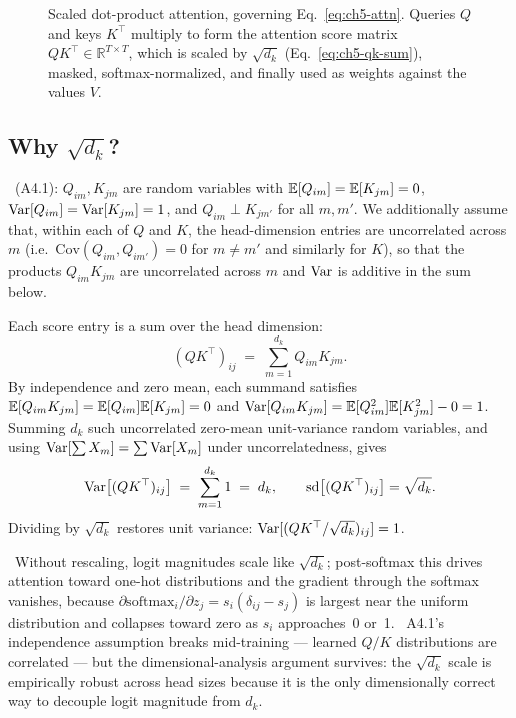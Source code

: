 \begin{figure}[h]
\centering

\caption{Scaled dot-product attention, governing
  Eq.~\eqref{eq:ch5-attn}. Queries $Q$ and keys $K^{\top}$ multiply
  to form the attention score matrix $Q K^{\top} \in \mathbb{R}^{T
  \times T}$, which is scaled by $\sqrt{d_k}$
  (Eq.~\eqref{eq:ch5-qk-sum}), masked, softmax-normalized, and
  finally used as weights against the values $V$.}
\label{fig:week4-attn-scores}
\end{figure}

\subsection{\texorpdfstring{Why $\sqrt{d_k}$?}{Why sqrt(d\_k)?}}

\begin{derivation}
\Assum\ (A4.1): $Q_{im}, K_{jm}$ are random variables with
$\mathbb{E}[Q_{im}] = \mathbb{E}[K_{jm}] = 0$, $\mathrm{Var}[Q_{im}] = \mathrm{Var}[K_{jm}] = 1$,
and $Q_{im} \perp K_{jm'}$ for all $m,m'$. We additionally assume
that, within each of $Q$ and $K$, the head-dimension entries are
uncorrelated across $m$ (i.e.\ $\mathrm{Cov}(Q_{im},Q_{im'}) = 0$ for
$m\neq m'$ and similarly for $K$), so that the products
$Q_{im}K_{jm}$ are uncorrelated across $m$ and $\mathrm{Var}$ is additive
in the sum below.
\label{eq:ch5-qk-var-assumption}

Each score entry is a sum over the head dimension:
\begin{equation}
(QK^{\top})_{ij} \;=\; \sum_{m=1}^{d_k} Q_{im} K_{jm}.
\label{eq:ch5-qk-sum}
\end{equation}
By independence and zero mean, each summand satisfies
$\mathbb{E}[Q_{im}K_{jm}] = \mathbb{E}[Q_{im}]\mathbb{E}[K_{jm}] = 0$ and
$\mathrm{Var}[Q_{im}K_{jm}] = \mathbb{E}[Q_{im}^2]\mathbb{E}[K_{jm}^2] - 0 = 1$. Summing $d_k$
such uncorrelated zero-mean unit-variance random variables, and
using $\mathrm{Var}[\sum X_m] = \sum \mathrm{Var}[X_m]$ under uncorrelatedness, gives
\begin{equation}
\mathrm{Var}\!\left[(QK^{\top})_{ij}\right] \;=\; \sum_{m=1}^{d_k} 1 \;=\; d_k,
\qquad
\mathrm{sd}\!\left[(QK^{\top})_{ij}\right] = \sqrt{d_k}.
\end{equation}
Dividing by $\sqrt{d_k}$ restores unit variance:
$\mathrm{Var}[(QK^{\top}/\sqrt{d_k})_{ij}] = 1$.
\end{derivation}

\Cons\ Without rescaling, logit magnitudes scale like $\sqrt{d_k}$;
post-softmax this drives attention toward one-hot distributions
and the gradient through the softmax vanishes, because
$\partial \mathrm{softmax}_i / \partial z_j = s_i(\delta_{ij} - s_j)$
is largest near the uniform distribution and collapses toward zero
as $s_i$ approaches~0 or~1. \Heur\ A4.1's independence assumption
breaks mid-training --- learned $Q/K$ distributions are correlated ---
but the dimensional-analysis argument survives: the $\sqrt{d_k}$ scale
is empirically robust across head sizes because it is the only
dimensionally correct way to decouple logit magnitude from $d_k$.

